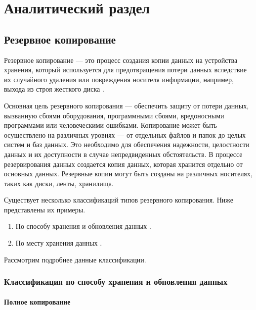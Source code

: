 \chapter{Аналитический раздел}

\section{Резервное копирование}

Резервное копирование --– это процесс создания копии данных на устройства хранения, который используется для предотвращения потери данных вследствие их случайного удаления или повреждения носителя информации, например, выхода из строя жесткого диска \cite{acronics-backup-info}.

Основная цель резервного копирования --- обеспечить защиту от потери данных, вызванную сбоями оборудования, программными сбоями, вредоносными программами или человеческими ошибками.
Копирование может быть осуществлено на различных уровнях --- от отдельных файлов и папок до целых систем и баз данных. 
Это необходимо для обеспечения надежности, целостности данных и их доступности в случае непредвиденных обстоятельств.
В процессе резервирования данных создается копия данных, которая хранится отдельно от основных данных. 
Резервные копии могут быть созданы на различных носителях, таких как диски, ленты, хранилища.

Существует несколько классификаций типов резервного копирования. Ниже представлены их примеры.
\begin{enumerate}
	\item По способу хранения и обновления данных \cite{local-cloud-backup}.
	\item По месту хранения данных \cite{backup-types}.
\end{enumerate}

Рассмотрим подробнее данные классификации.

\newpage
\subsection{Классификация по способу хранения и обновления данных}
\subsubsection{Полное копирование}


